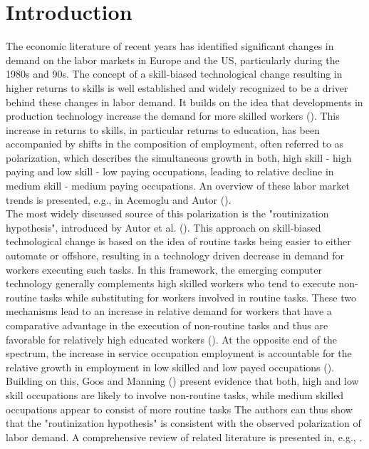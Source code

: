 \documentclass[../main.tex]{subfiles}
\begin{document}
\section{Introduction}
\label{sec:introduction}
The economic literature of recent years has identified significant changes in demand on the labor markets in Europe and the US, particularly during the 1980s and 90s. The concept of a skill-biased technological change resulting in higher returns to skills is well established and widely recognized to be a driver behind these changes in labor demand. It builds on the idea that developments in production technology increase the demand for more skilled workers (\cite{acemoglu2011skills}).
This increase in returns to skills, in particular returns to education, has been accompanied by shifts in the composition of employment, often referred to as polarization, which describes the simultaneous growth in both, high skill - high paying and low skill - low paying occupations, leading to relative decline in medium skill - medium paying occupations. An overview of these labor market trends is presented, e.g., in Acemoglu and Autor (\citeyear{acemoglu2011skills}).
\\
The most widely discussed source of this polarization is the "routinization hypothesis", introduced by Autor et al. (\citeyear{autor2003skill}). This approach on skill-biased technological change is based on the idea of routine tasks being easier to either automate or offshore, resulting in a technology driven decrease in demand for workers executing such tasks. In this framework, the emerging computer technology generally complements high skilled workers who tend to execute non-routine tasks while substituting for workers involved in routine tasks. These two mechanisms lead to an increase in relative demand for workers that have a comparative advantage in the execution of non-routine tasks and thus are favorable for relatively high educated workers (\cite{autor2003skill}). At the opposite end of the spectrum, the increase in service occupation employment is accountable for the relative growth in employment in low skilled and low payed occupations (\cite{autor2010inequality}). Building on this, Goos and Manning (\citeyear{goos2007lousy}) present evidence that both, high and low skill occupations are likely to involve non-routine tasks, while medium skilled occupations appear to consist of more routine tasks The authors can thus show that the "routinization hypothesis" is consistent with the observed polarization of labor demand. A comprehensive review of related literature is presented in, e.g., \cite{green2015has}.
\end{document}
